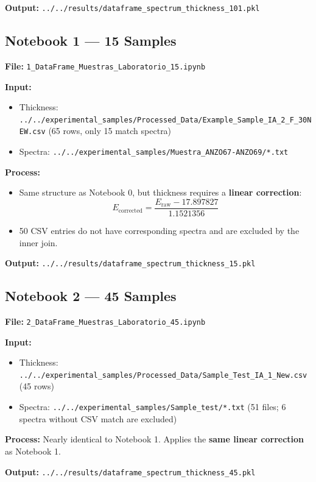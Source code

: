 \documentclass[11pt,a4paper]{article}
\begin{document}
\textbf{Output:} {\tt ../../results/dataframe\_spectrum\_thickness\_101.pkl}

\subsection{Notebook 1 --- 15 Samples}
\textbf{File:} {\tt 1\_DataFrame\_Muestras\_Laboratorio\_15.ipynb}

\textbf{Input:}
\begin{itemize}
    \item Thickness: {\tt ../../experimental\_samples/Processed\_Data/Example\_Sample\_IA\_2\_F\_30NEW.csv} (65 rows, only 15 match spectra)
    \item Spectra: {\tt ../../experimental\_samples/Muestra\_ANZO67-ANZO69/*.txt}
\end{itemize}

\textbf{Process:}
\begin{itemize}
    \item Same structure as Notebook 0, but thickness requires a \textbf{linear correction}:
    \begin{equation*}
        E_{\text{corrected}} = \frac{E_{\text{raw}} - 17.897827}{1.1521356}
    \end{equation*}
    \item 50 CSV entries do not have corresponding spectra and are excluded by the inner join.
\end{itemize}

\textbf{Output:} {\tt ../../results/dataframe\_spectrum\_thickness\_15.pkl}

\subsection{Notebook 2 --- 45 Samples}
\textbf{File:} {\tt 2\_DataFrame\_Muestras\_Laboratorio\_45.ipynb}

\textbf{Input:}
\begin{itemize}
    \item Thickness: {\tt ../../experimental\_samples/Processed\_Data/Sample\_Test\_IA\_1\_New.csv} (45 rows)
    \item Spectra: {\tt ../../experimental\_samples/Sample\_test/*.txt} (51 files; 6 spectra without CSV match are excluded)
\end{itemize}

\textbf{Process:} Nearly identical to Notebook 1. Applies the \textbf{same linear correction} as Notebook 1.

\textbf{Output:} {\tt ../../results/dataframe\_spectrum\_thickness\_45.pkl}
\end{document}
